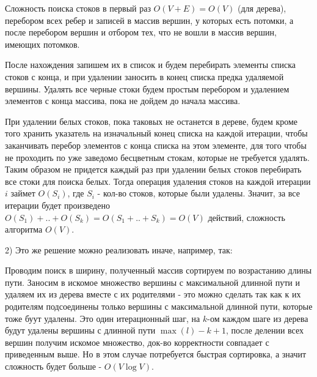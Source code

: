 \documentclass[a4paper,12pt]{article}
\begin{document}
Сложность поиска стоков в первый раз $O(V+E)=O(V)$ (для дерева), перебором всех ребер и записей в массив вершин, у которых есть потомки, а после перебором вершин и отбором тех, что не вошли в массив вершин, имеющих потомков. 

После нахождения запишем их в список и будем перебирать элементы списка стоков с конца, и при удалении заносить в конец списка предка удаляемой вершины. Удалять все черные стоки будем простым перебором и удалением элементов с конца массива, пока не дойдем до начала массива. 

При удалении белых стоков, пока таковых не останется в дереве, будем кроме того  хранить указатель на изначальный конец списка на каждой итерации, чтобы заканчивать перебор элементов с конца списка на этом элементе, для того чтобы не проходить по уже заведомо бесцветным стокам, которые не требуется удалять. Таким образом не придется каждый раз при удалении белых стоков перебирать все стоки для поиска белых. Тогда операция удаления стоков на каждой итерации $i$ займет $O(S_{i})$, где $S_{i}$ - кол-во стоков, которые были удалены. Значит, за все итерации будет произведено $O(S_{1})+..+O(S_{k})=O(S_{1}+..+S_{k})=O(V)$ действий, сложность алгоритма $O(V)$.

2) Это же решение можно реализовать иначе, например, так:

Проводим поиск в ширину, полученный массив сортируем по возрастанию длины пути. Заносим в искомое множество вершины с максимальной длинной пути и удаляем их из дерева вместе с их родителями - это можно сделать так как к их родителям подсоединены только вершины с максимальной длинной пути, которые тоже буут удалены. Это один итерационный шаг, на $k$-ом каждом шаге из дерева будут удалены вершины с длинной пути $\max{(l)}-k+1$, после делении всех вершин получим искомое множество, док-во корректности совпадает с приведенным выше. Но в этом случае потребуется быстрая сортировка, а значит сложность будет больше - $O(V\log{V})$. 
\end{document}
